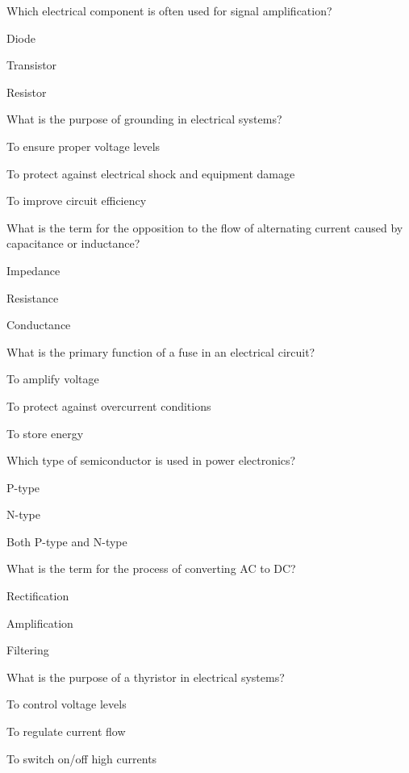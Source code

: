 \begin{enhancedmcq}{Which electrical component is often used for signal amplification?}
\item Diode
\item Transistor
\item Resistor

\end{enhancedmcq}
\begin{enhancedmcq}{What is the purpose of grounding in electrical systems?}
\item To ensure proper voltage levels
\item To protect against electrical shock and equipment damage
\item To improve circuit efficiency

\end{enhancedmcq}
\begin{enhancedmcq}{What is the term for the opposition to the flow of alternating current caused by capacitance or inductance?}
\item Impedance
\item Resistance
\item Conductance

\end{enhancedmcq}
\begin{enhancedmcq}{What is the primary function of a fuse in an electrical circuit?}
\item To amplify voltage
\item To protect against overcurrent conditions
\item To store energy

\end{enhancedmcq}
\begin{enhancedmcq}{Which type of semiconductor is used in power electronics?}
\item P-type
\item N-type
\item Both P-type and N-type

\end{enhancedmcq}
\begin{enhancedmcq}{What is the term for the process of converting AC to DC?}
\item Rectification
\item Amplification
\item Filtering

\end{enhancedmcq}
\begin{enhancedmcq}{What is the purpose of a thyristor in electrical systems?}
\item To control voltage levels
\item To regulate current flow
\item To switch on/off high currents

\end{enhancedmcq}
